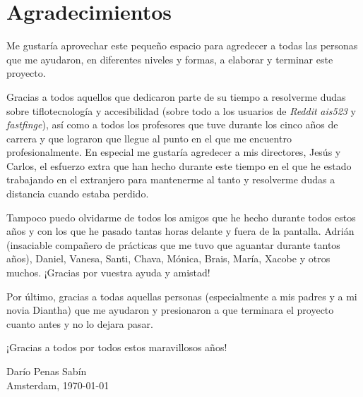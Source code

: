 %
%

\section*{Agradecimientos}

Me gustaría aprovechar este pequeño espacio para agredecer a todas las personas que me ayudaron, en diferentes niveles y formas, a elaborar y terminar este proyecto.

Gracias a todos aquellos que dedicaron parte de su tiempo a resolverme dudas sobre tiflotecnología y accesibilidad (sobre todo a los usuarios de \textit{Reddit} \textit{ais523} y \textit{fastfinge}), así como a todos los profesores que tuve durante los cinco años de carrera y que lograron que llegue al punto en el que me encuentro profesionalmente. En especial me gustaría agredecer a mis directores, Jesús y Carlos, el esfuerzo extra que han hecho durante este tiempo en el que he estado trabajando en el extranjero para mantenerme al tanto y resolverme dudas a distancia cuando estaba perdido.

Tampoco puedo olvidarme de todos los amigos que he hecho durante todos estos años y con los que he pasado tantas horas delante y fuera de la pantalla. Adrián (insaciable compañero de prácticas que me tuvo que aguantar durante tantos años), Daniel, Vanesa, Santi, Chava, Mónica, Brais, María, Xacobe y otros muchos. ¡Gracias por vuestra ayuda y amistad!

Por último, gracias a todas aquellas personas (especialmente a mis padres y a mi novia Diantha) que me ayudaron y presionaron a que terminara el proyecto cuanto antes y no lo dejara pasar.

¡Gracias a todos por todos estos maravillosos años!

\begin{flushright}
  Darío Penas Sabín \\
  Amsterdam, \today
\end{flushright}

